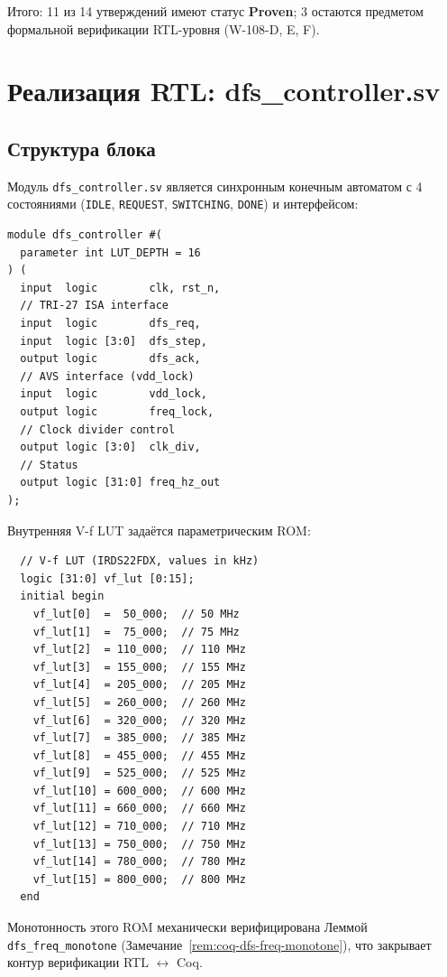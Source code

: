 Итого: 11 из 14 утверждений имеют статус \textbf{Proven}; 3 остаются
предметом формальной верификации RTL-уровня (W-108-D, E, F).

\section{Реализация RTL: dfs\_controller.sv}
\label{sec:glava86-rtl}

\subsection{Структура блока}
\label{subsec:rtl-structure}

Модуль \texttt{dfs\_controller.sv} является синхронным конечным автоматом
с 4 состояниями (\texttt{IDLE}, \texttt{REQUEST}, \texttt{SWITCHING},
\texttt{DONE}) и интерфейсом:
\begin{verbatim}
module dfs_controller #(
  parameter int LUT_DEPTH = 16
) (
  input  logic        clk, rst_n,
  // TRI-27 ISA interface
  input  logic        dfs_req,
  input  logic [3:0]  dfs_step,
  output logic        dfs_ack,
  // AVS interface (vdd_lock)
  input  logic        vdd_lock,
  output logic        freq_lock,
  // Clock divider control
  output logic [3:0]  clk_div,
  // Status
  output logic [31:0] freq_hz_out
);
\end{verbatim}

Внутренняя V-f LUT задаётся параметрическим ROM:
\begin{verbatim}
  // V-f LUT (IRDS22FDX, values in kHz)
  logic [31:0] vf_lut [0:15];
  initial begin
    vf_lut[0]  =  50_000;  // 50 MHz
    vf_lut[1]  =  75_000;  // 75 MHz
    vf_lut[2]  = 110_000;  // 110 MHz
    vf_lut[3]  = 155_000;  // 155 MHz
    vf_lut[4]  = 205_000;  // 205 MHz
    vf_lut[5]  = 260_000;  // 260 MHz
    vf_lut[6]  = 320_000;  // 320 MHz
    vf_lut[7]  = 385_000;  // 385 MHz
    vf_lut[8]  = 455_000;  // 455 MHz
    vf_lut[9]  = 525_000;  // 525 MHz
    vf_lut[10] = 600_000;  // 600 MHz
    vf_lut[11] = 660_000;  // 660 MHz
    vf_lut[12] = 710_000;  // 710 MHz
    vf_lut[13] = 750_000;  // 750 MHz
    vf_lut[14] = 780_000;  // 780 MHz
    vf_lut[15] = 800_000;  // 800 MHz
  end
\end{verbatim}

Монотонность этого ROM механически верифицирована Леммой
\texttt{dfs\_freq\_monotone} (Замечание~\ref{rem:coq-dfs-freq-monotone}),
что закрывает контур верификации RTL $\leftrightarrow$ Coq.

